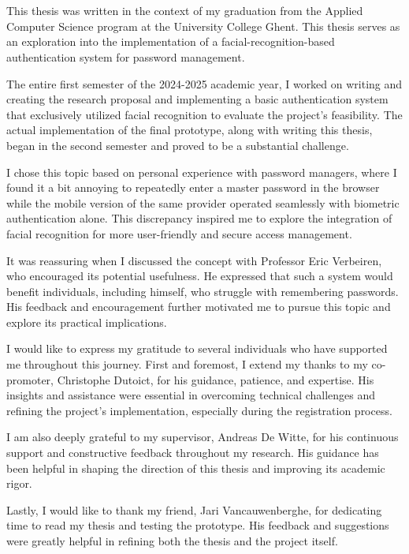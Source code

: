 
\chapter*{}%
\label{ch:voorwoord}


This thesis was written in the context of my graduation from the Applied Computer Science program at the University College Ghent. This thesis serves as an exploration into the implementation of a facial-recognition-based authentication system for password management.

The entire first semester of the 2024-2025 academic year, I worked on writing and creating the research proposal and implementing a basic authentication system that exclusively utilized facial recognition to evaluate the project's feasibility. The actual implementation of the final prototype, along with writing this thesis, began in the second semester and proved to be a substantial challenge.

I chose this topic based on personal experience with password managers, where I found it a bit annoying to repeatedly enter a master password in the browser while the mobile version of the same provider operated seamlessly with biometric authentication alone. This discrepancy inspired me to explore the integration of facial recognition for more user-friendly and secure access management.

It was reassuring when I discussed the concept with Professor Eric Verbeiren, who encouraged its potential usefulness. He expressed that such a system would benefit individuals, including himself, who struggle with remembering passwords. His feedback and encouragement further motivated me to pursue this topic and explore its practical implications.

I would like to express my gratitude to several individuals who have supported me throughout this journey. First and foremost, I extend my thanks to my co-promoter, Christophe Dutoict, for his guidance, patience, and expertise. His insights and assistance were essential in overcoming technical challenges and refining the project’s implementation, especially during the registration process.

I am also deeply grateful to my supervisor, Andreas De Witte, for his continuous support and constructive feedback throughout my research. His guidance has been helpful in shaping the direction of this thesis and improving its academic rigor.

Lastly, I would like to thank my friend, Jari Vancauwenberghe, for dedicating time to read my thesis and testing the prototype. His feedback and suggestions were greatly helpful in refining both the thesis and the project itself.
